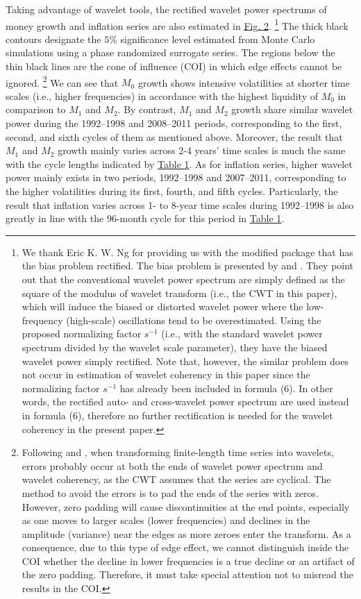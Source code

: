 \documentclass[a4paper,fleqn]{cas-sc}
\begin{document}
Taking advantage of wavelet tools, the rectified wavelet power spectrums of money growth and inflation series are also estimated in \hyperref[fig:2]{Fig. 2}. 
\footnote{We thank Eric K. W. Ng for providing us with the modified package that has the bias problem rectified. The bias problem is presented by \cite*{liu2007} and \cite*{veleda2012}. They point out that the conventional wavelet power spectrum are simply defined as the square of the modulus of wavelet transform (i.e., the CWT in this paper), which will induce the biased or distorted wavelet power where the low-frequency (high-scale) oscillations tend to be overestimated. Using the proposed normalizing factor $s^{-1}$ (i.e., with the standard wavelet power spectrum divided by the wavelet scale parameter), they have the biased wavelet power simply rectified. Note that, however, the similar problem does not occur in estimation of wavelet coherency in this paper since the normalizing factor $s^{-1}$ has already been included in formula (6). In other words, the rectified auto- and cross-wavelet power spectrum are used instead in formula (6), therefore no further rectification is needed for the wavelet coherency in the present paper.}
The thick black contours designate the $5\%$ significance level estimated from Monte Carlo simulations using a phase randomized surrogate series. The regions below the thin black lines are the cone of influence (COI) in which edge effects cannot be ignored.
\footnote{Following \cite*{torrence1998} and \cite{grinsted2004}, when transforming finite-length time series into wavelets, errors probably occur at both the ends of wavelet power spectrum and wavelet coherency, as the CWT assumes that the series are cyclical. The method to avoid the errors is to pad the ends of the series with zeros. However, zero padding will cause discontinuities at the end points, especially as one moves to larger scales (lower frequencies) and declines in the amplitude (variance) near the edges as more zeroes enter the transform. As a consequence, due to this type of edge effect, we cannot distinguish inside the COI whether the decline in lower frequencies is a true decline or an artifact of the zero padding. Therefore, it must take special attention not to misread the results in the COI.}
We can see that $M_0$ growth shows intensive volatilities at shorter time scales (i.e., higher frequencies) in accordance with the highest liquidity of $M_0$ in comparison to $M_1$ and $M_2$. By contrast, $M_1$ and $M_2$ growth share similar wavelet power during the 1992–1998 and 2008–2011 periods, corresponding to the first, second, and sixth cycles of them as mentioned above. Moreover, the result that $M_1$ and $M_2$ growth mainly varies across 2-4 years' time scales is much the same with the cycle lengths indicated by \hyperref[tbl1]{Table 1}. As for inflation series, higher wavelet power mainly exists in two periods, 1992–1998 and 2007–2011, corresponding to the higher volatilities during its first, fourth, and fifth cycles. Particularly, the result that inflation varies across 1- to 8-year time scales during 1992–1998 is also greatly in line with the 96-month cycle for this period in \hyperref[tbl1]{Table 1}.
\end{document}
